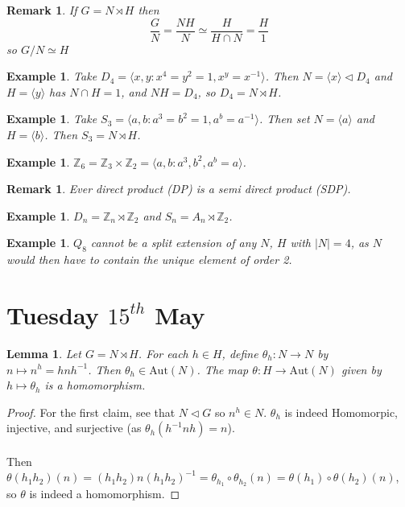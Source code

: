 \documentclass[a4paper,10pt]{article}
\newcommand{\ZZ}{\mathbb{Z}}
\newtheorem{eg}[thm]{Example}
\newtheorem{Lem}[thm]{Lemma}
\newtheorem{rem}[thm]{Remark}
\begin{document}
\begin{rem}
If $G = N \rtimes H$ then
\[ \frac{G}{N} = \frac{NH}{N} \simeq \frac{H}{H \cap N} = \frac{H}{1} \]
so $G / N \simeq H$
\end{rem}


\begin{eg}
Take $D_4 = \langle x,y : x^4 = y^2 = 1, x^y = x^{-1} \rangle$. Then $N = \langle x \rangle  \triangleleft D_4$ and $H = \langle y \rangle$ has $N \cap H = 1$, and $NH = D_4$, so $D_4 = N \rtimes H$.
\end{eg}

\begin{eg}
Take $S_3 = \langle a,b : a^3 = b^2 = 1, a^b = a^{-1} \rangle$. Then set $N = \langle a \rangle$ and $H = \langle b \rangle$. Then $S_3 = N \rtimes H$. 
\end{eg}

\begin{eg}
$\ZZ_6 = \ZZ_3 \times \ZZ_2 = \langle a,b : a^3, b^2, a^b = a \rangle$. 
\end{eg}

\begin{rem}
Ever direct product (DP) is a semi direct product (SDP).
\end{rem}

\begin{eg}
$D_n = \ZZ_n \rtimes \ZZ_2$ and $S_n = A_n \rtimes \ZZ_2$. 
\end{eg}

\begin{eg}
$Q_8$ cannot be a split extension of any $N$, $H$ with $|N| = 4$, as $N$ would then have to contain the unique element of order 2.
\end{eg}





\newpage
\section{Tuesday $15^{th}$ May}

\begin{Lem}
Let $G = N \rtimes H$. For each $h \in H$, define $\theta_h : N \rightarrow N$ by $n \mapsto n^h = h n h^{-1}$. Then $\theta_h \in \text{Aut}(N)$. The map $\theta : H \rightarrow \text{Aut}(N)$ given by $h \mapsto \theta_h$ is a homomorphism. 
\end{Lem}

\begin{proof}
For the first claim, see that $N \triangleleft G$ so $n^h \in N$. $\theta_h$ is indeed Homomorpic, injective, and surjective (as $\theta_h(h^{-1} n h) = n$). \\
\\
Then $\theta(h_1 h_2) (n) = (h_1 h_2) n (h_1 h_2)^{-1} = \theta_{h_1} \circ \theta_{h_2} (n) = \theta(h_1) \circ \theta(h_2) (n)$, so $\theta$ is indeed a homomorphism.
\end{proof}
\end{document}
